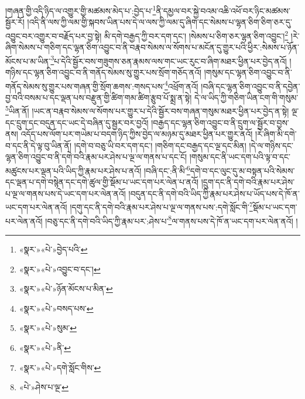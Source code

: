 །གཞན་གྱི་འདི་ཉིད་ལ་འགྱུར་གྱི་མཚམས་མེད་པ་:བྱེད་པ་\footnote{«སྣར་»«པེ་»བྱེད་པའི་}ནི་དམྱལ་བར་སྐྱེ་བའམ་འཆི་འཕོ་བར་ཉིང་མཚམས་སྦྱོར་རོ། །འདི་ནི་ལས་ཀྱི་ལམ་གྱི་སྐབས་ཡིན་པས་དེ་ལ་ལས་ཀྱི་ལམ་དུ་ཞིག་དང་སེམས་པ་ལྷན་ཅིག་ཅིག་ཅར་དུ་འབྱུང་བར་འགྱུར་བ་བརྗོད་པར་བྱ་སྟེ། མི་དགེ་བརྒྱད་ཀྱི་བར་དག་དང་། །སེམས་པ་ཅིག་ཅར་ལྷན་ཅིག་འབྱུང་།\footnote{«སྣར་»«པེ་»འབྱུང་བ་དང་།} །རེ་ཞིག་སེམས་པ་གཅིག་དང་ལྷན་ཅིག་འབྱུང་བ་ནི་བརྣབ་སེམས་ལ་སོགས་པ་མངོན་དུ་གྱུར་པའི་ཕྱིར་:སེམས་པ་ཉོན་མོངས་པ་མ་ཡིན་\footnote{«སྣར་»«པེ་»ཉོན་མོངས་པ་མིན་}པ་དེའི་སྦྱོར་བས་གཟུགས་ཅན་རྣམས་ལས་གང་ཡང་རུང་བ་ཞིག་མཐར་ཕྱིན་པར་བྱེད་ནའོ། །གཉིས་དང་ལྷན་ཅིག་འབྱུང་བ་ནི་གནོད་སེམས་སུ་གྱུར་པས་སྲོག་གཅོད་ནའོ། །གསུམ་དང་ལྷན་ཅིག་འབྱུང་བ་ནི་གནོད་སེམས་སུ་གྱུར་པས་གཞན་གྱི་སྲོག་ཆགས་:གསད་པས་\footnote{«སྣར་»«པེ་»བསད་པས་}འཕྲོག་ནའོ། །བཞི་དང་ལྷན་ཅིག་འབྱུང་བ་ནི་དབྱེན་བྱ་བའི་བསམ་པ་དང་ལྡན་པས་བརྫུན་གྱི་ཚིག་གམ་ཚིག་རྩུབ་པོ་སྨྲ་ན་སྟེ། དེ་ལ་ཡིད་ཀྱི་གཅིག་ཡིན་ངག་གི་གསུམ་\footnote{«སྣར་»«པེ་»སུམ་}ཡིན་ནོ། །ཡང་ན་བརྣབ་སེམས་ལ་སོགས་པར་གྱུར་པ་དེའི་སྦྱོར་བས་གཞན་གསུམ་མཐར་ཕྱིན་པར་བྱེད་ན་སྟེ། ལྔ་དང་དྲུག་དང་བདུན་དང་ཡང་དེ་བཞིན་དུ་སྦྱར་བར་བྱའོ། །བརྒྱད་དང་ལྷན་ཅིག་འབྱུང་བ་ནི་དྲུག་ལ་སྦྱོར་བ་བྱས་ནས། འདོད་པས་ལོག་པར་གཡེམ་པ་བདག་ཉིད་ཀྱིས་བྱེད་ལ་མཉམ་དུ་མཐར་ཕྱིན་པར་གྱུར་ནའོ། །རེ་ཞིག་མི་དགེ་བ་དང་ནི་དེ་ལྟ་བུ་ཡིན་ནོ། །དགེ་བ་བཅུ་ཡི་བར་དག་དང་། །གཅིག་དང་བརྒྱད་དང་ལྔ་དང་མིན། །དེ་ལ་གཉིས་དང་ལྷན་ཅིག་འབྱུང་བ་ནི་དགེ་བའི་རྣམ་པར་ཤེས་པ་ལྔ་ལ་གནས་པ་དང་ངོ། །གསུམ་དང་ནི་ཡང་དག་པའི་ལྟ་བ་དང་མཚུངས་པར་ལྡན་པའི་ཡིད་ཀྱི་རྣམ་པར་ཤེས་པ་ནའོ། །བཞི་དང་:ནི་མི་\footnote{«སྣར་»«པེ་»ནི་}དགེ་བ་དང་ལུང་དུ་མ་བསྟན་པའི་སེམས་དང་ལྡན་པ་དགེ་བསྙེན་དང་དགེ་ཚུལ་གྱི་སྡོམ་པ་ཡང་དག་པར་ལེན་པ་ནའོ། །དྲུག་དང་ནི་དགེ་བའི་རྣམ་པར་ཤེས་པ་ལྔ་ལ་གནས་པས་དེ་ཡང་དག་པར་ལེན་ནའོ། །བདུན་དང་ནི་དགེ་བའི་ཡིད་ཀྱི་རྣམ་པར་ཤེས་པ་ཡོད་པས་དེ་ཁོ་ན་ཡང་དག་པར་ལེན་ནའོ། །དགུ་དང་ནི་དགེ་བའི་རྣམ་པར་ཤེས་པ་ལྔ་ལ་གནས་པས་:དགེ་སློང་གི་\footnote{«སྣར་»«པེ་»དགེ་སློང་གིས་}སྡོམ་པ་ཡང་དག་པར་ལེན་ནའོ། །བཅུ་དང་ནི་དགེ་བའི་ཡིད་ཀྱི་རྣམ་པར་:ཤེས་པ་\footnote{«པེ་»ཤེས་པ་ལྔ་}ལ་གནས་པས་དེ་ཁོ་ན་ཡང་དག་པར་ལེན་ནའོ། །
